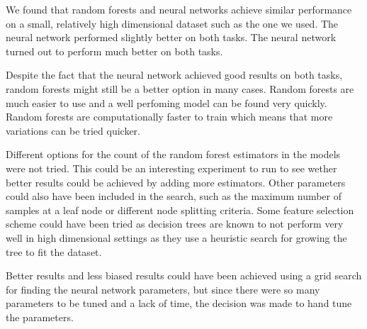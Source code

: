 
We found that random forests and neural networks achieve similar performance on a small, relatively high dimensional dataset such as the one we used. The neural network performed slightly better on both tasks. The neural network turned out to perform much better on both tasks.

Despite the fact that the neural network achieved good results on both tasks, random forests might still be a better option in many cases. Random forests are much easier to use and a well perfoming model can be found very quickly. Random forests are computationally faster to train which means that more variations can be tried quicker.

Different options for the count of the random forest estimators in the models were not tried. This could be an interesting experiment to run to see wether better results could be achieved by adding more estimators. Other parameters could also have been included in the search, such as the maximum number of samples at a leaf node or different node splitting criteria. Some feature selection scheme could have been tried as decision trees are known to not perform very well in high dimensional settings as they use a heuristic search for growing the tree to fit the dataset.

Better results and less biased results could have been achieved using a grid search for finding the neural network parameters, but since there were so many parameters to be tuned and a lack of time, the decision was made to hand tune the parameters.


